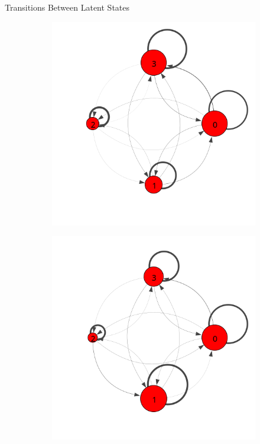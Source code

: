 \documentclass[final,t]{beamer}
\begin{document}
\begin{frame}[fragile]
\begin{columns}[t]
\begin{column}{0.6\textwidth}
\begin{block}{Transitions Between Latent States}
\begin{figure}
\begin{subfigure}[t]{0.32\textwidth}
            \caption{\label{fig:trans-avg}}
          \end{subfigure}%
          \begin{subfigure}[t]{0.32\textwidth}
            \includegraphics[width=\textwidth,trim={0 2cm 0 0cm}]{../../figures/trans-comp/trans-perfect.png}
            \caption{\label{fig:trans-perfect}}
          \end{subfigure}%
          \begin{subfigure}[t]{0.32\textwidth}
            \includegraphics[width=\textwidth,trim={0 2cm 0 0cm}]{../../figures/trans-comp/trans-low.png}

\end{subfigure}
\end{figure}
\end{block}
\end{column}
\end{columns}
\end{frame}
\end{document}
